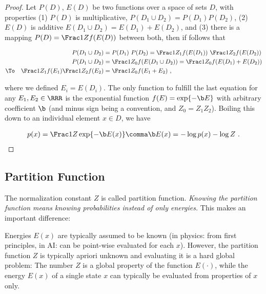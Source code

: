 {\small
\begin{proof}
Let $P(D)$, $E(D)$ be two functions over a space of sets $D$, with 
properties (1) $P(D)$ is multiplicative, $P(D_1 \cup D_2) = P(D_1) P(D_2)$, (2) $E(D)$ is additive $E(D_1\cup D_2) = E(D_1) + E(D_2)$, and (3) there is a mapping $P(D) = \Frac 1Z f(E(D))$ between both, then if follows that

\begin{align}
P(D_1\cup D_2)
&= P(D_1)~ P(D_2) = \Frac 1{Z_1} f(E(D_1))~ \Frac 1{Z_2} f(E(D_2)) \\
P(D_1\cup D_2)
&= \Frac 1{Z_0} f(E(D_1\cup D_2)) = \Frac 1{Z_0} f(E(D_1) + E(D_2)) \\
\To\quad \Frac 1{Z_1} f(E_1) \Frac 1{Z_2} f(E_2)
&= \Frac 1{Z_0} f(E_1+E_2) ~, \label{exp}
\end{align}

where we defined $E_i=E(D_i)$. The only function to fulfill
the last equation for any $E_1,E_2\in\RRR$ is the exponential function $f(E) = \exp\lbrace -\b E \rbrace$ with arbitrary
 coefficient $\b$ (and minus sign being a convention, and $Z_0 = Z_1
 Z_2$). Boiling this down to an individual element $x\in D$, we have

\begin{align}
p(x) = \Frac 1Z \exp\lbrace-\b E(x)\rbrace \comma \b E(x) = -\log p(x) - \log Z ~.
\end{align}

\end{proof}
}


\subsection{Partition Function}

The normalization constant $Z$ is called partition function. 
\emph{Knowing the partition function means knowing probabilities instead of only energies.} This makes an important difference:

Energies $E(x)$ are typically assumed to be known (in physics: from
first principles, in AI: can be point-wise evaluated for each
$x$). However, the partition function $Z$ is typically apriori unknown
and evaluating it is a hard global problem: The number $Z$ is a global
property of the function $E(\cdot)$, while the energy $E(x)$ of a
single state $x$ can typically be evaluated from properties of $x$
only.

